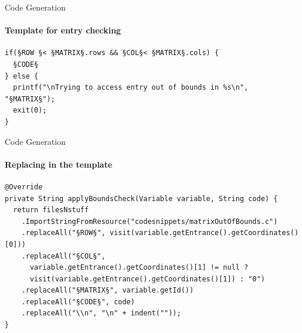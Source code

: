 \begin{frame}[fragile,t]{Code Generation}
\framesubtitle{Template for entry checking}
\begin{lstlisting}[caption=The template for checking if an entry is out of bounds in a matrix.,frame=tlrb, basicstyle=\tiny, numbers=none]
if(§ROW §< §MATRIX§.rows && §COL§< §MATRIX§.cols) {
  §CODE§
} else {
  printf("\nTrying to access entry out of bounds in %s\n", "§MATRIX§");
  exit(0);
}

\end{lstlisting}

\end{frame}


\begin{frame}[fragile,t]{Code Generation}
\framesubtitle{Replacing in the template}
\begin{lstlisting}[caption=The visit method called generating code for the for loop.,frame=tlrb, basicstyle=\tiny, numbers=none]
@Override
private String applyBoundsCheck(Variable variable, String code) {
  return filesNstuff
    .ImportStringFromResource("codesnippets/matrixOutOfBounds.c")
    .replaceAll("§ROW§", visit(variable.getEntrance().getCoordinates()[0]))
    .replaceAll("§COL§",
      variable.getEntrance().getCoordinates()[1] != null ?
      visit(variable.getEntrance().getCoordinates()[1]) : "0")
    .replaceAll("§MATRIX§", variable.getId())
    .replaceAll("§CODE§", code)
    .replaceAll("\\n", "\n" + indent(""));
}

\end{lstlisting}

\end{frame}







